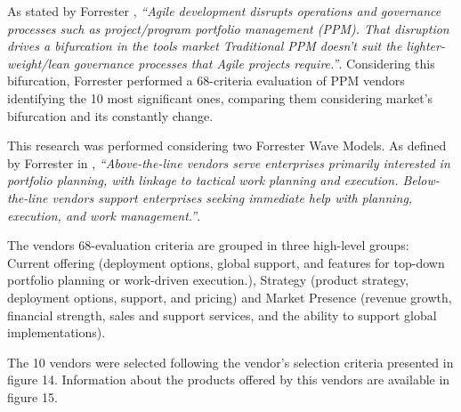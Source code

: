 As stated by Forrester \cite{forresterWavePPM}, \textit{``Agile development disrupts operations and governance processes such as project/program portfolio management (PPM). That disruption drives a bifurcation in the tools market \- Traditional PPM doesn't suit the lighter-weight/lean governance processes that Agile projects require.''}. Considering this bifurcation, Forrester performed a 68-criteria evaluation of PPM vendors identifying the 10 most significant ones, comparing them  considering market's bifurcation and its constantly change.\par
This research was performed considering two Forrester Wave Models. As defined by Forrester in \cite{forresterWavePPM}, \textit{``Above-the-line vendors serve enterprises primarily interested in portfolio planning, with linkage to tactical work planning and execution. Below-the-line vendors support enterprises seeking immediate help with planning, execution, and work management.''}.\par
The vendors 68-evaluation criteria are grouped in three high-level groups: Current offering (deployment options, global support, and features for top-down portfolio planning or work-driven execution.), Strategy (product strategy, deployment options, support, and pricing) and Market Presence (revenue growth, financial strength, sales and support services, and the ability to support global implementations).\par
The 10 vendors were selected following the vendor's selection criteria presented in figure 14. Information about the products offered by this vendors are available in figure 15.\par


